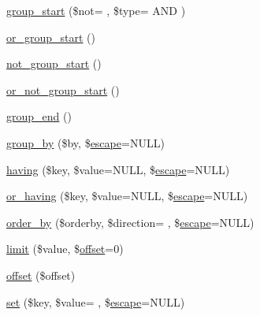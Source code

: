\begin{DoxyCompactItemize}
\item 
\hyperlink{class_c_i___d_b__query__builder_a7a7026d58f7388d90d31475a66a2a2d1}{group\+\_\+start} (\$not= \textquotesingle{}\textquotesingle{}, \$type= \textquotesingle{}A\+N\+D \textquotesingle{})
\item 
\hyperlink{class_c_i___d_b__query__builder_a80d5e4a0d8f2d0f202e8df6816865838}{or\+\_\+group\+\_\+start} ()
\item 
\hyperlink{class_c_i___d_b__query__builder_ae0b543e6db440c4a717714b5d5782e7a}{not\+\_\+group\+\_\+start} ()
\item 
\hyperlink{class_c_i___d_b__query__builder_a16a0c2a5f37a7be4c487670650d13faf}{or\+\_\+not\+\_\+group\+\_\+start} ()
\item 
\hyperlink{class_c_i___d_b__query__builder_ad97adc35e18afc9d4f26e0f568cdc6ed}{group\+\_\+end} ()
\item 
\hyperlink{class_c_i___d_b__query__builder_a111cc822f85357c4cfe37886e6315dce}{group\+\_\+by} (\$by, \$\hyperlink{class_c_i___d_b__driver_ac8f37ca5703d4558c732e692194f8cd6}{escape}=N\+U\+L\+L)
\item 
\hyperlink{class_c_i___d_b__query__builder_af19efb51311e6f648a0035a0f94fceb6}{having} (\$key, \$value=N\+U\+L\+L, \$\hyperlink{class_c_i___d_b__driver_ac8f37ca5703d4558c732e692194f8cd6}{escape}=N\+U\+L\+L)
\item 
\hyperlink{class_c_i___d_b__query__builder_a14528cda8dcca86ebb9b597d9c8d1c14}{or\+\_\+having} (\$key, \$value=N\+U\+L\+L, \$\hyperlink{class_c_i___d_b__driver_ac8f37ca5703d4558c732e692194f8cd6}{escape}=N\+U\+L\+L)
\item 
\hyperlink{class_c_i___d_b__query__builder_af4bc938040ad30a93e4880f61568c72e}{order\+\_\+by} (\$orderby, \$direction= \textquotesingle{}\textquotesingle{}, \$\hyperlink{class_c_i___d_b__driver_ac8f37ca5703d4558c732e692194f8cd6}{escape}=N\+U\+L\+L)
\item 
\hyperlink{class_c_i___d_b__query__builder_a875b0d4703f176c36e771d728a9a04a0}{limit} (\$value, \$\hyperlink{class_c_i___d_b__query__builder_afd31b65425a2b5cf30711bf29e1b1851}{offset}=0)
\item 
\hyperlink{class_c_i___d_b__query__builder_afd31b65425a2b5cf30711bf29e1b1851}{offset} (\$offset)
\item 
\hyperlink{class_c_i___d_b__query__builder_ad24529c8e6cd4e3f58c0a3e55815b532}{set} (\$key, \$value= \textquotesingle{}\textquotesingle{}, \$\hyperlink{class_c_i___d_b__driver_ac8f37ca5703d4558c732e692194f8cd6}{escape}=N\+U\+L\+L)
\item 

\end{DoxyCompactItemize}

